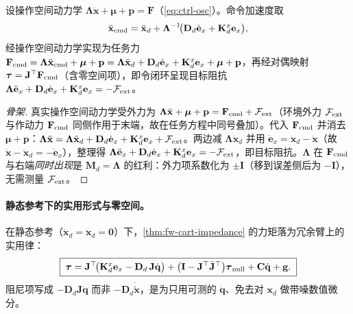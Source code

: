 \begin{theorem}[笛卡尔阻抗控制律（$\mathbf{M}_d=\boldsymbol{\Lambda}$）]
\label{thm:fw-cart-impedance}
设操作空间动力学 $\boldsymbol{\Lambda}\ddot{\mathbf{x}}+\boldsymbol{\mu}+\mathbf{p}=\mathbf{F}$（\cref{eq:ctrl-osc}）。命令加速度取
\begin{equation}
  \ddot{\mathbf{x}}_{\rm cmd}=\ddot{\mathbf{x}}_d+\boldsymbol{\Lambda}^{-1}\!\big(\mathbf{D}_d\dot{\mathbf{e}}_x+\mathbf{K}_d^x\mathbf{e}_x\big),
  \label{eq:fw-cart-xcmd}
\end{equation}
经操作空间动力学实现为任务力 $\mathbf{F}_{\rm cmd}=\boldsymbol{\Lambda}\ddot{\mathbf{x}}_{\rm cmd}+\boldsymbol{\mu}+\mathbf{p}=\boldsymbol{\Lambda}\ddot{\mathbf{x}}_d+\mathbf{D}_d\dot{\mathbf{e}}_x+\mathbf{K}_d^x\mathbf{e}_x+\boldsymbol{\mu}+\mathbf{p}$，再经对偶映射 $\boldsymbol{\tau}=\mathbf{J}^\top\mathbf{F}_{\rm cmd}$（含零空间项），即令闭环呈现目标阻抗 $\boldsymbol{\Lambda}\ddot{\mathbf{e}}_x+\mathbf{D}_d\dot{\mathbf{e}}_x+\mathbf{K}_d^x\mathbf{e}_x=-\mathcal{F}_{\rm ext}$。
\end{theorem}

\begin{proof}[骨架]
真实操作空间动力学受外力为 $\boldsymbol{\Lambda}\ddot{\mathbf{x}}+\boldsymbol{\mu}+\mathbf{p}=\mathbf{F}_{\rm cmd}+\mathcal{F}_{\rm ext}$（环境外力 $\mathcal{F}_{\rm ext}$ 与作动力 $\mathbf{F}_{\rm cmd}$ 同侧作用于末端，故在任务方程中同号叠加）。代入 $\mathbf{F}_{\rm cmd}$ 并消去 $\boldsymbol{\mu}+\mathbf{p}$：$\boldsymbol{\Lambda}\ddot{\mathbf{x}}=\boldsymbol{\Lambda}\ddot{\mathbf{x}}_d+\mathbf{D}_d\dot{\mathbf{e}}_x+\mathbf{K}_d^x\mathbf{e}_x+\mathcal{F}_{\rm ext}$。两边减 $\boldsymbol{\Lambda}\ddot{\mathbf{x}}_d$ 并用 $\ddot{\mathbf{e}}_x=\ddot{\mathbf{x}}_d-\ddot{\mathbf{x}}$（故 $\ddot{\mathbf{x}}-\ddot{\mathbf{x}}_d=-\ddot{\mathbf{e}}_x$），整理得 $\boldsymbol{\Lambda}\ddot{\mathbf{e}}_x+\mathbf{D}_d\dot{\mathbf{e}}_x+\mathbf{K}_d^x\mathbf{e}_x=-\mathcal{F}_{\rm ext}$，即目标阻抗。$\boldsymbol{\Lambda}$ 在 $\mathbf{F}_{\rm cmd}$ 与右端\emph{同时出现}是 $\mathbf{M}_d=\boldsymbol{\Lambda}$ 的红利：外力项系数化为 $\pm\mathbf{I}$（移到误差侧后为 $-\mathbf{I}$），无需测量 $\mathcal{F}_{\rm ext}$。
\end{proof}

\paragraph{静态参考下的实用形式与零空间。}
在静态参考（$\dot{\mathbf{x}}_d=\ddot{\mathbf{x}}_d=\mathbf{0}$）下，\cref{thm:fw-cart-impedance} 的力矩落为冗余臂上的实用律：
\begin{equation}
  \boxed{\;\boldsymbol{\tau}=\mathbf{J}^\top\!\big(\mathbf{K}_d^x\mathbf{e}_x-\mathbf{D}_d\,\mathbf{J}\dot{\mathbf{q}}\big)+\big(\mathbf{I}-\mathbf{J}^\top\bar{\mathbf{J}}^\top\big)\boldsymbol{\tau}_{\rm null}+\mathbf{C}\dot{\mathbf{q}}+\mathbf{g}.\;}
  \label{eq:fw-cart-law}
\end{equation}
阻尼项写成 $-\mathbf{D}_d\mathbf{J}\dot{\mathbf{q}}$ 而非 $-\mathbf{D}_d\dot{\tilde{\mathbf{x}}}$，是为只用可测的 $\dot{\mathbf{q}}$、免去对 $\mathbf{x}_d$ 做带噪数值微分。

